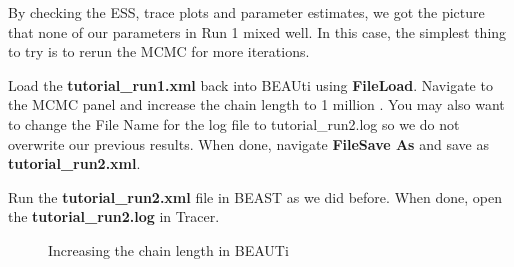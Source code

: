 \documentclass[11pt]{article}
\begin{document}
By checking the ESS, trace plots and parameter estimates, we got the picture that none of our parameters in Run 1 mixed well. In this case, the simplest thing to try is to rerun the MCMC for more iterations.

\begin{framed}
Load the \textbf{tutorial\_run1.xml} back into BEAUti using \textbf{File\textrightarrow Load}. Navigate to the MCMC panel and increase the chain length to 1 million \label{fig:beauti_run2}. You may also want to change the File Name for the log file to tutorial\_run2.log so we do not overwrite our previous results. When done, navigate \textbf{File\textrightarrow Save As} and save as \textbf{tutorial\_run2.xml}.
\end{framed}

\begin{framed}
Run the \textbf{tutorial\_run2.xml} file in BEAST as we did before. When done, open the \textbf{tutorial\_run2.log} in Tracer.
\end{framed}

\begin{figure}[!h]
\centering
{}
\caption{\small Increasing the chain length in BEAUTi}
\label{fig:beauti_run2}
\end{figure}
\end{document}
